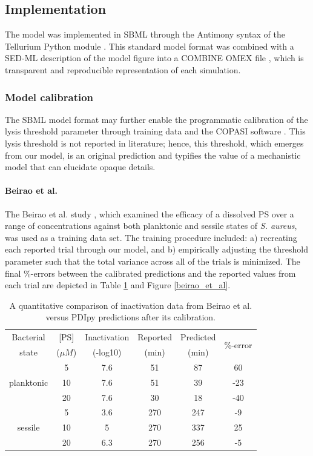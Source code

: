 \subsection{Implementation}
The model was implemented in SBML \cite{Keating2020Models} through the Antimony syntax of the Tellurium Python module \cite{Choi2018Tellurium:Biology}. This standard model format was combined with a SED-ML description of the model figure \cite{Waltemath2011ReproducibleLanguage} into a COMBINE OMEX file \cite{Bergmann2014COMBINEProject}, which is transparent and reproducible representation of each simulation. 
\subsubsection*{Model calibration}
The SBML model format may further enable the programmatic calibration of the lysis threshold parameter through training data and the COPASI software \cite{Bergmann2017COPASIBiotechnology}. This lysis threshold is not reported in literature; hence, this threshold, which emerges from our model, is an original prediction and typifies the value of a mechanistic model that can elucidate opaque details.

\paragraph{Beirao et al.}
The Beirao et al. study \cite{Beirao2014PhotodynamicPorphyrin}, which examined the efficacy of a dissolved PS over a range of concentrations against both planktonic and sessile states of \textit{S. aureus}, was used as a training data set. The training procedure included: a) recreating each reported trial through our model, and b) empirically adjusting the threshold parameter such that the total variance across all of the trials is minimized. The final \%-errors between the calibrated predictions and the reported values from each trial are depicted in Table \ref{beirao_et_al_data} and Figure \ref{beirao_et_al}. 

\begin{table}
    \centering
    \begin{tabular}{c|c|c|c|c|c}
        Bacterial & [PS] & Inactivation & Reported & Predicted & \multirow{2}{1.2cm}{\%-error}\\
        state & ($\mu M$) & (-log10) & (min) & (min) & \\
        \toprule
        \multirow{3}{1.5cm}{planktonic} & 5 & 7.6 & 51 & 87 & 60\\
        & 10 & 7.6 & 51 & 39 & -23\\
        & 20 & 7.6 & 30 & 18 & -40\\
        \midrule
        \multirow{3}{1.5cm}{sessile} & 5 & 3.6 & 270 & 247 & -9\\
        & 10 & 5 & 270 & 337 & 25\\
        & 20 & 6.3 & 270 & 256 & -5\\
        \bottomrule
    \end{tabular}
    \caption{
        A quantitative comparison of inactivation data from Beirao et al. versus PDIpy predictions after its calibration. 
    }
    \label{beirao_et_al_data}
\end{table}

